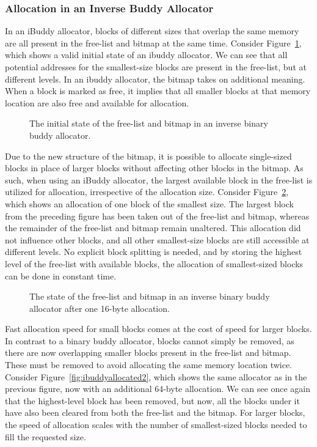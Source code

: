\subsubsection{Allocation in an Inverse Buddy Allocator}
In an iBuddy allocator, blocks of different sizes that overlap the same memory are all present in the free-list and bitmap at the same time. Consider Figure~\ref{fig:ibuddyinitial}, which shows a valid initial state of an ibuddy allocator. We can see that all potential addresses for the smallest-size blocks are present in the free-list, but at different levels. In an ibuddy allocator, the bitmap takes on additional meaning. When a block is marked as free, it implies that all smaller blocks at that memory location are also free and available for allocation.

\begin{figure}[H]
    \centering
    
    \caption{The initial state of the free-list and bitmap in an inverse binary buddy allocator.}
    \label{fig:ibuddyinitial}
\end{figure}

Due to the new structure of the bitmap, it is possible to allocate single-sized blocks in place of larger blocks without affecting other blocks in the bitmap. As such, when using an iBuddy allocator, the largest available block in the free-list is utilized for allocation, irrespective of the allocation size. Consider Figure~\ref{fig:ibuddyallocated}, which shows an allocation of one block of the smallest size. The largest block from the preceding figure has been taken out of the free-list and bitmap, whereas the remainder of the free-list and bitmap remain unaltered. This allocation did not influence other blocks, and all other smallest-size blocks are still accessible at different levels. No explicit block splitting is needed, and by storing the highest level of the free-list with available blocks, the allocation of smallest-sized blocks can be done in constant time.

\begin{figure}[H]
    \centering
    
    \caption{The state of the free-list and bitmap in an inverse binary buddy allocator after one
16-byte allocation.}
    \label{fig:ibuddyallocated}
\end{figure}

Fast allocation speed for small blocks comes at the cost of speed for larger blocks. In contrast to a binary buddy allocator, blocks cannot simply be removed, as there are now overlapping smaller blocks present in the free-list and bitmap. These must be removed to avoid allocating the same memory location twice. Consider Figure~\ref{fig:ibuddyallocated2}, which shows the same allocator as in the previous figure, now with an additional 64-byte allocation. We can see once again that the highest-level block has been removed, but now, all the blocks under it have also been cleared from both the free-list and the bitmap. For larger blocks, the speed of allocation scales with the number of smallest-sized blocks needed to fill the requested size. 

